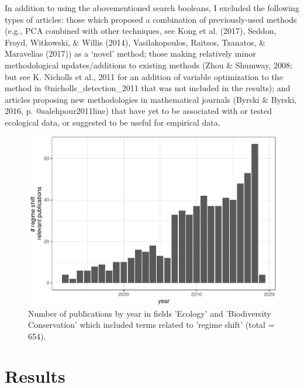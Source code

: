 \documentclass[12pt,twoside,openany]{reedthesis}
\begin{document}
In addition to using the abovementioned search booleans, I excluded the following types of articles: those which proposed a combination of previously-used methods (e.g., PCA combined with other techniques, see Kong et al. (2017), Seddon, Froyd, Witkowski, \& Willis (2014), Vasilakopoulos, Raitsos, Tzanatos, \& Maravelias (2017)) as a `novel' method; those making relatively minor methodological updates/additions to existing methods (Zhou \& Shumway, 2008; but see K. Nicholls et al., 2011 for an addition of variable optimization to the method in @nicholls\_detection\_2011 that was not included in the results); and articles proposing new methodologies in mathematical journals (Byrski \& Byrski, 2016, p. @salehpour2011line) that have yet to be associated with or tested ecological data, or suggested to be useful for empirical data.
\begin{figure}

{\centering \includegraphics[width=0.85\linewidth]{_myDissertation_files/figure-latex/wosRegimePubsByYear-1} 

}

\caption{Number of publications by year in fields 'Ecology' and 'Biodiversity Conservation' which included terms related to 'regime shift' (total = 654).}\label{fig:wosRegimePubsByYear}
\end{figure}
\hypertarget{results}{%
\section{Results}\label{results}}
\end{document}
